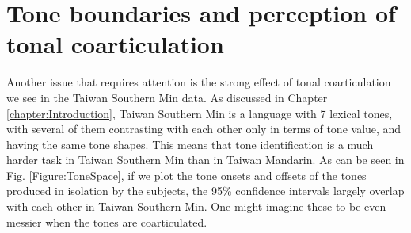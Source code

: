 \section{Tone boundaries and perception of tonal coarticulation}
Another issue that requires attention is the strong effect of tonal coarticulation we see in the Taiwan Southern Min data. As discussed in Chapter \ref{chapter:Introduction}, Taiwan Southern Min is a language with 7 lexical tones, with several of them contrasting with each other only in terms of tone value, and having the same tone shapes. This means that tone identification is a much harder task in Taiwan Southern Min than in Taiwan Mandarin. As can be seen in Fig. \ref{Figure:ToneSpace}, if we plot the tone onsets and offsets of the tones produced in isolation by the subjects, the 95\% confidence intervals largely overlap with each other in Taiwan Southern Min. One might imagine these to be even messier when the tones are coarticulated.
